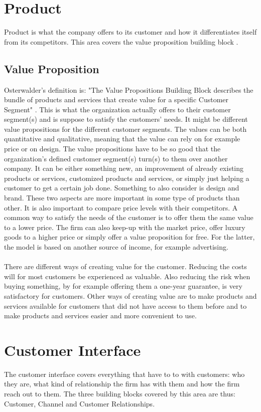 \section{Product}
Product is what the company offers to its customer and how it differentiates itself from its competitors. This area covers the value proposition building block \cite{osterwalderthesis}.

\subsection{Value Proposition}
Osterwalder's definition is: "The Value Propositions Building Block describes the bundle of products and services that create value for a specific Customer Segment" \cite{osterwalder}. This is what the organization actually offers to their customer segment(s) and is suppose to satisfy the customers' needs. It might be different value propositions for the different customer segments. The values can be both quantitative and qualitative, meaning that the value can rely on for example price or on design. The value propositions have to be so good that the organization's defined customer segment(s) turn(s) to them over another company. It can be either something new, an improvement of already existing products or services, customized products and services, or simply just helping a customer to get a certain job done. Something to also consider is design and brand. These two aspects are more important in some type of products than other. It is also important to compare price levels with their competitors. A common way to satisfy the needs of the customer is to offer them the same value to a lower price. The firm can also keep-up with the market price, offer luxury goods to a higher price or simply offer a value proposition for free. For the latter, the model is based on another source of income, for example advertising. \\ \\
There are different ways of creating value for the customer. Reducing the costs will for most customers be experienced as valuable. Also reducing the risk when buying something, by for example offering them a one-year guarantee, is very satisfactory for customers. Other ways of creating value are to make products and services available for customers that did not have access to them before and to make products and services easier and more convenient to use. \cite{osterwalder}

\section{Customer Interface}
The customer interface covers everything that have to to with customers: who they are, what kind of relationship the firm has with them and how the firm reach out to them. The three building blocks covered by this area are thus: Customer, Channel and Customer Relationships. \cite{osterwalderthesis}

